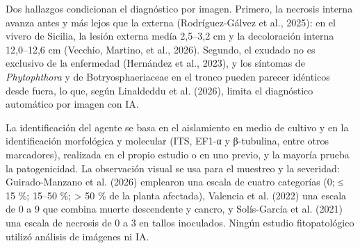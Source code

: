 \documentclass[11pt]{article}
\newcommand{\sangria}{\hspace*{1.27cm}}
\begin{document}
\sangria Dos hallazgos condicionan el diagnóstico por imagen. Primero, la necrosis interna avanza antes y más lejos que la externa (Rodríguez-Gálvez et al., 2025): en el vivero de Sicilia, la lesión externa medía 2,5–3,2 cm y la decoloración interna 12,0–12,6 cm (Vecchio, Martino, et al., 2026). Segundo, el exudado no es exclusivo de la enfermedad (Hernández et al., 2023), y los síntomas de \textit{Phytophthora} y de Botryosphaeriaceae en el tronco pueden parecer idénticos desde fuera, lo que, según Linaldeddu et al. (2026), limita el diagnóstico automático por imagen con IA.

\sangria La identificación del agente se basa en el aislamiento en medio de cultivo y en la identificación morfológica y molecular (ITS, EF1-α y β-tubulina, entre otros marcadores), realizada en el propio estudio o en uno previo, y la mayoría prueba la patogenicidad. La observación visual se usa para el muestreo y la severidad: Guirado-Manzano et al. (2026) emplearon una escala de cuatro categorías (0; ≤ 15 \%; 15–50 \%; > 50 \% de la planta afectada), Valencia et al. (2022) una escala de 0 a 9 que combina muerte descendente y cancro, y Solís-García et al. (2021) una escala de necrosis de 0 a 3 en tallos inoculados. Ningún estudio fitopatológico utilizó análisis de imágenes ni IA.
\end{document}
